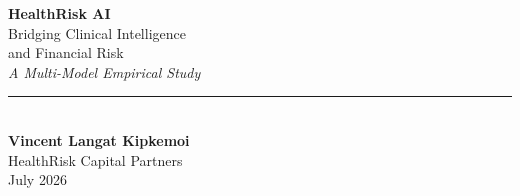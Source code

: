 \documentclass[12pt,a4paper]{article}
\begin{document}
\begin{titlepage}
  \pagecolor{navyblue}
  \color{white}
  \vspace*{2cm}
  \begin{center}
    {\Huge\bfseries HealthRisk AI}\\[0.8em]
    {\LARGE Bridging Clinical Intelligence\\[0.3em]and Financial Risk}\\[1.2em]
    {\large\textit{A Multi-Model Empirical Study}}\\[2em]
    \textcolor{accentblue}{\rule{10cm}{1pt}}\\[1.5em]
    {\large\bfseries Vincent Langat Kipkemoi}\\[0.4em]
    {\normalsize HealthRisk Capital Partners}\\[0.2em]
    {\normalsize July 2026}\\[3em]
  \end{center}

  \nopagecolor
  \newpage
  \pagecolor{white}
  \color{black}
\end{titlepage}

\begin{abstract}
\noindent
Financial institutions underwriting, insuring, and investing in healthcare
assets---insurance books, hospital bonds, pharmaceutical equities---have
historically priced risk from financial ratios alone, blind to the clinical
data that causally drives the outcomes they are pricing. \textbf{HealthRisk AI}
closes this intelligence gap through a five-layer architecture processing
seven international clinical databases into production-grade models spanning
30-day readmission prediction, 12-month cost forecasting, hospital bond default
scoring, pharmaceutical pipeline valuation, and a Monte Carlo simulation engine.
This paper presents the full methodology and empirical results across all model
families, with quantified performance against industry benchmarks and regulatory
targets.
\end{abstract}
\end{document}

